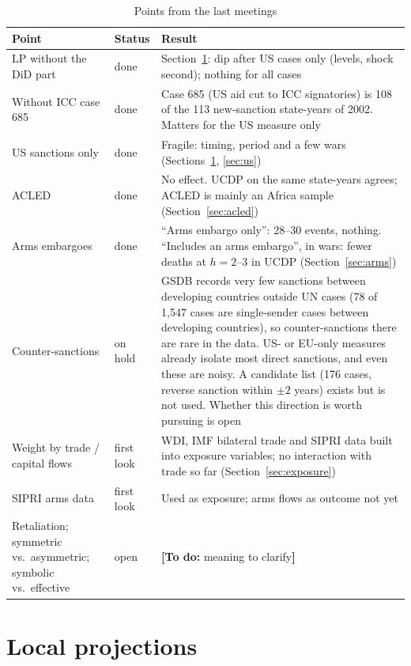 \documentclass[11pt,a4paper]{article}
\newif\ifshowtodos \showtodostrue
\newcommand{\todo}[1]{\ifshowtodos{\color{red!70!black}\textbf{[To do:} #1\textbf{]}}\fi}
\begin{document}
\begin{table}[H]
\centering\small
\caption{Points from the last meetings}
\label{tab:status}
\begin{tabularx}{\textwidth}{@{}p{3.9cm}p{1.6cm}X@{}}
\toprule
Point & Status & Result \\
\midrule
LP without the DiD part & done & Section~\ref{sec:lp}: dip after US cases only (levels, shock second); nothing for all cases \\
Without ICC case 685 & done & Case 685 (US aid cut to ICC signatories) is 108 of the 113 new-sanction state-years of 2002. Matters for the US measure only \\
US sanctions only & done & Fragile: timing, period and a few wars (Sections~\ref{sec:lp}, \ref{sec:us}) \\
ACLED & done & No effect. UCDP on the same state-years agrees; ACLED is mainly an Africa sample (Section~\ref{sec:acled}) \\
Arms embargoes & done & ``Arms embargo only'': 28--30 events, nothing. ``Includes an arms embargo'', in wars: fewer deaths at $h=2$--3 in UCDP (Section~\ref{sec:arms}) \\
Counter-sanctions & on hold & GSDB records very few sanctions between developing countries outside UN cases (78 of 1{,}547 cases are single-sender cases between developing countries), so counter-sanctions there are rare in the data. US- or EU-only measures already isolate most direct sanctions, and even these are noisy. A candidate list (176 cases, reverse sanction within $\pm 2$ years) exists but is not used. Whether this direction is worth pursuing is open \\
Weight by trade / capital flows & first look & WDI, IMF bilateral trade and SIPRI data built into exposure variables; no interaction with trade so far (Section~\ref{sec:exposure}) \\
SIPRI arms data & first look & Used as exposure; arms flows as outcome not yet \\
Retaliation; symmetric vs.\ asymmetric; symbolic vs.\ effective & open & \todo{meaning to clarify} \\
\bottomrule
\end{tabularx}
\end{table}

\section{Local projections}
\label{sec:lp}
\end{document}
